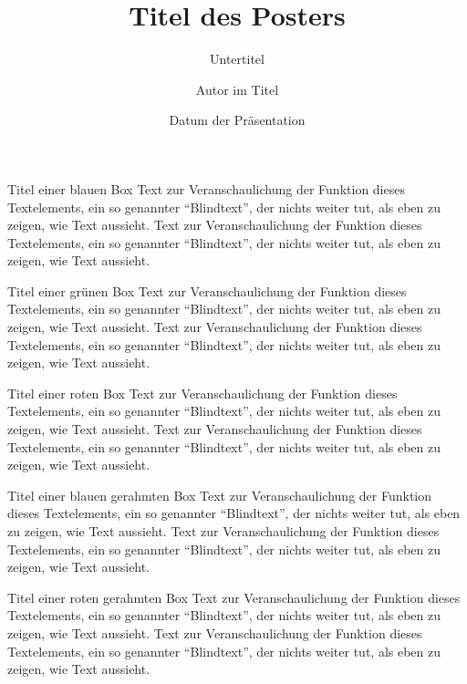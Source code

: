 \documentclass[german,portrait]{univie-ling-poster}
\author[Autor in Fußzeile]{Autor im Titel}
\title{Titel des Posters}
\subtitle{Untertitel}
\date{Datum der Präsentation}
\begin{document}
\begin{frame}

\begin{bluebox}{Titel einer blauen Box}
	Text zur Veranschaulichung der Funktion dieses Textelements, ein so
	genannter \enquote{Blindtext}, der nichts weiter tut, als eben zu zeigen,
	wie Text aussieht. Text zur Veranschaulichung der Funktion dieses Textelements, ein so
	genannter \enquote{Blindtext}, der nichts weiter tut, als eben zu zeigen,
	wie Text aussieht.
\end{bluebox}

\begin{greenbox}{Titel einer grünen Box}
	Text zur Veranschaulichung der Funktion dieses Textelements, ein so
	genannter \enquote{Blindtext}, der nichts weiter tut, als eben zu zeigen,
	wie Text aussieht. Text zur Veranschaulichung der Funktion dieses Textelements, ein so
	genannter \enquote{Blindtext}, der nichts weiter tut, als eben zu zeigen,
	wie Text aussieht.
\end{greenbox}


\begin{redbox}{Titel einer roten Box}
	Text zur Veranschaulichung der Funktion dieses Textelements, ein so
	genannter \enquote{Blindtext}, der nichts weiter tut, als eben zu zeigen,
	wie Text aussieht. Text zur Veranschaulichung der Funktion dieses Textelements, ein so
	genannter \enquote{Blindtext}, der nichts weiter tut, als eben zu zeigen,
	wie Text aussieht.
\end{redbox}

\begin{blueframedbox}{Titel einer blauen gerahmten Box}
	Text zur Veranschaulichung der Funktion dieses Textelements, ein so
	genannter \enquote{Blindtext}, der nichts weiter tut, als eben zu zeigen,
	wie Text aussieht. Text zur Veranschaulichung der Funktion dieses Textelements, ein so
	genannter \enquote{Blindtext}, der nichts weiter tut, als eben zu zeigen,
	wie Text aussieht.
\end{blueframedbox}

\begin{redframedbox}{Titel einer roten gerahmten Box}
	Text zur Veranschaulichung der Funktion dieses Textelements, ein so
	genannter \enquote{Blindtext}, der nichts weiter tut, als eben zu zeigen,
	wie Text aussieht. Text zur Veranschaulichung der Funktion dieses Textelements, ein so
	genannter \enquote{Blindtext}, der nichts weiter tut, als eben zu zeigen,
	wie Text aussieht.
\end{redframedbox}


\end{frame}
\end{document}
